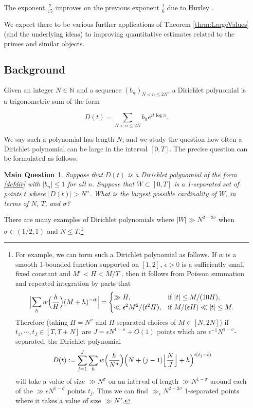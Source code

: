 \documentclass{amsart}
\theoremstyle{plain}
\newtheorem*{mainques}{Main Question}
\numberwithin{equation}{section}
\begin{document}
The exponent $\frac{2}{15}$ improves on the previous exponent $\frac{1}{6}$ due to Huxley \cite{Hu}.

We expect there to be various further applications of Theorem \ref{thrm:LargeValues} (and the underlying ideas) to improving quantitative estimates related to the primes and similar objects.

%
%

\subsection{Background}

Given an integer $N\in \mathbb{N}$ and a sequence $(b_n)_{N<n\le 2N}$, a Dirichlet polynomial is a trigonometric sum of the form

\begin{equation} \label{defdir} D(t) = \sum_{N<n\le 2N} b_n e^{i t \log n}. \end{equation} 

\noindent We say such a polynomial has length $N$, and we study the question how often a Dirichlet polynomial can be large in the interval $[0, T]$.  The precise question can be formulated as follows.

\begin{mainques} Suppose that $D(t)$ is a Dirichlet polynomial of the form \eqref{defdir} with $|b_n| \le 1$ for all $n$.  Suppose that $W \subset [0, T]$ is a 1-separated set of points $t$ where $|D(t)| > N^\sigma$.  What is the largest possible cardinality of $W$, in terms of $N$, $T$, and $\sigma$?
\end{mainques}

There are many examples of Dirichlet polynomials where $|W| \gg  N^{2 - 2 \sigma}$ when $\sigma\in(1/2,1)$ and $N\le T$.\footnote{For example, we can form such a Dirichlet polynomial as follows. If $w$ is a smooth 1-bounded function supported on $[1,2]$, $\epsilon>0$ is a sufficiently small fixed constant and $M^{\epsilon}<H<M/T^{\epsilon}$, then it follows from Poisson summation and repeated integration by parts that
\[
\Bigl|\sum_{h}w\Bigl(\frac{h}{H}\Bigr)(M+h)^{-it}\Bigr|= \begin{cases}
\gg H,\qquad &\text{if }|t|\le M/(10H),\\
\ll \epsilon^2M^2/(t^2H),&\text{if } M/(\epsilon H)\ll |t|\le M.
\end{cases}
\]
Therefore (taking $H=N^\sigma$ and $H$-separated choices of $M\in [N,2N]$) if $t_1,\cdots,t_J\in [T,T+N]$ are $J=\epsilon N^{1-\sigma}+O(1)$ points which are $\epsilon^{-1}N^{1-\sigma}$-separated, the Dirichlet polynomial
\[
D(t):=\sum_{j=1}^J \sum_{h}w\Bigl(\frac{h}{ N^\sigma}\Bigr)\Bigl(N+(j-1)\Bigl\lfloor \frac{N}{J}\Bigr\rfloor+h\Bigr)^{i(t_j-t)}
\]
will take a value of size $\gg N^\sigma$ on an interval of length $\gg N^{1-\sigma}$ around each of the $\gg \epsilon N^{1-\sigma}$ points $t_j$. Thus we can find $\gg_\epsilon N^{2-2\sigma}$ 1-separated points where it takes a value of size $\gg N^\sigma$.}
\end{document}
